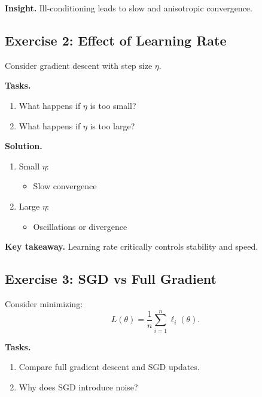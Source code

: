 \medskip

\noindent
\textbf{Insight.}  
Ill-conditioning leads to slow and anisotropic convergence.

\subsection{Exercise 2: Effect of Learning Rate}

Consider gradient descent with step size $\eta$.

\medskip

\noindent
\textbf{Tasks.}
\begin{enumerate}
    \item What happens if $\eta$ is too small?
    \item What happens if $\eta$ is too large?
\end{enumerate}

\medskip

\noindent
\textbf{Solution.}

\begin{enumerate}
\item Small $\eta$:
\begin{itemize}
    \item Slow convergence
\end{itemize}

\item Large $\eta$:
\begin{itemize}
    \item Oscillations or divergence
\end{itemize}
\end{enumerate}

\medskip

\noindent
\textbf{Key takeaway.}  
Learning rate critically controls stability and speed.

\subsection{Exercise 3: SGD vs Full Gradient}

Consider minimizing:
\[
L(\theta) = \frac{1}{n} \sum_{i=1}^n \ell_i(\theta).
\]

\medskip

\noindent
\textbf{Tasks.}
\begin{enumerate}
    \item Compare full gradient descent and SGD updates.
    \item Why does SGD introduce noise?
\end{enumerate}

